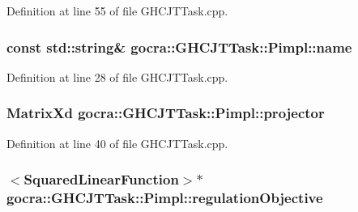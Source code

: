 Definition at line 55 of file G\+H\+C\+J\+T\+Task.\+cpp.

\subsubsection[{\texorpdfstring{name}{name}}]{\setlength{\rightskip}{0pt plus 5cm}const std\+::string\& gocra\+::\+G\+H\+C\+J\+T\+Task\+::\+Pimpl\+::name}\hypertarget{structgocra_1_1GHCJTTask_1_1Pimpl_a62bf1c09164be6cf8a48360bd6e53d64}{}\label{structgocra_1_1GHCJTTask_1_1Pimpl_a62bf1c09164be6cf8a48360bd6e53d64}


Definition at line 28 of file G\+H\+C\+J\+T\+Task.\+cpp.

\subsubsection[{\texorpdfstring{projector}{projector}}]{\setlength{\rightskip}{0pt plus 5cm}Matrix\+Xd gocra\+::\+G\+H\+C\+J\+T\+Task\+::\+Pimpl\+::projector}\hypertarget{structgocra_1_1GHCJTTask_1_1Pimpl_ab17e7af214e9801bfb03e4d9ed6dad29}{}\label{structgocra_1_1GHCJTTask_1_1Pimpl_ab17e7af214e9801bfb03e4d9ed6dad29}


Definition at line 40 of file G\+H\+C\+J\+T\+Task.\+cpp.

\subsubsection[{\texorpdfstring{regulation\+Objective}{regulationObjective}}]{$<${\bf Squared\+Linear\+Function}$>$$\ast$ gocra\+::\+G\+H\+C\+J\+T\+Task\+::\+Pimpl\+::regulation\+Objective}\hypertarget{structgocra_1_1GHCJTTask_1_1Pimpl_a59fe897e1cfa0a5b28a52f0d1be7d13d}{}\label{structgocra_1_1GHCJTTask_1_1Pimpl_a59fe897e1cfa0a5b28a52f0d1be7d13d}


